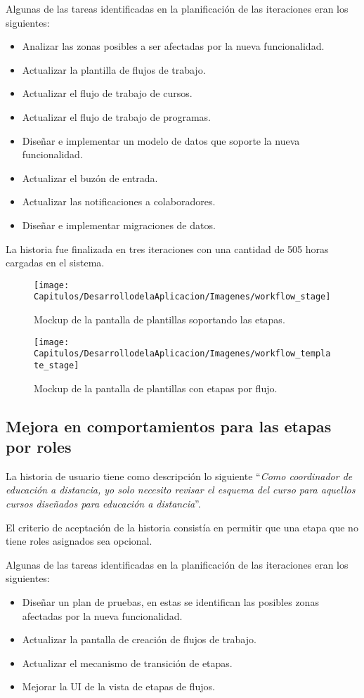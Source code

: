 Algunas de las tareas identificadas en la planificación de las iteraciones eran los siguientes:
\begin{itemize}
	\item Analizar las zonas posibles a ser afectadas por la nueva funcionalidad.
	\item Actualizar la plantilla de flujos de trabajo.
	\item Actualizar el flujo de trabajo de cursos.
	\item Actualizar el flujo de trabajo de programas.
	\item Diseñar e implementar un modelo de datos que soporte la nueva funcionalidad.
	\item Actualizar el buzón de entrada.
	\item Actualizar las notificaciones a colaboradores.
	\item Diseñar e implementar migraciones de datos.
\end{itemize}

La historia fue finalizada en tres iteraciones con una cantidad de 505 horas cargadas en el sistema.

\begin{figure}[H]
\centering
\texttt{[image: Capitulos/DesarrollodelaAplicacion/Imagenes/workflow\_stage]}
\caption{Mockup de la pantalla de plantillas soportando las etapas.}
  \label{workflow_stage}
\end{figure}

\begin{figure}[H]
\centering
\texttt{[image: Capitulos/DesarrollodelaAplicacion/Imagenes/workflow\_template\_stage]}
\caption{Mockup de la pantalla de plantillas con etapas por flujo.}
  \label{workflow_template_stage}
\end{figure}

\subsection{Mejora en comportamientos para las etapas por roles}
La historia de usuario tiene como descripción lo siguiente \enquote{\textit{Como coordinador de educación a distancia, yo solo necesito revisar el esquema del curso para aquellos cursos diseñados para educación a distancia}}.

El criterio de aceptación de la historia consistía en permitir que una etapa que no tiene roles asignados sea opcional.

Algunas de las tareas identificadas en la planificación de las iteraciones eran los siguientes:
\begin{itemize}
	\item Diseñar un plan de pruebas, en estas se identifican las posibles zonas afectadas por la nueva funcionalidad.
	\item Actualizar la pantalla de creación de flujos de trabajo.
	\item Actualizar el mecanismo de transición de etapas.
	\item Mejorar la UI de la vista de etapas de flujos.
\end{itemize}


